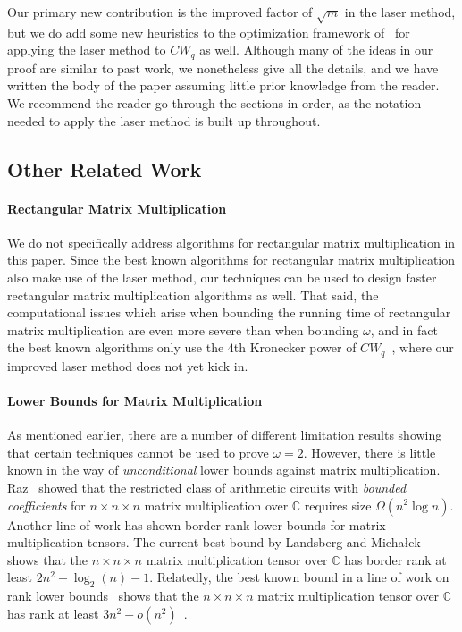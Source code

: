 \PassOptionsToPackage{shortlabels}{enumitem}\documentclass[10pt,a4paper]{article}
\begin{document}
Our primary new contribution is the improved factor of $\sqrt{m}$ in the laser method, but we do add some new heuristics to the optimization framework of~\cite{v12,legall} for applying the laser method to $CW_q$ as well. Although many of the ideas in our proof are similar to past work, we nonetheless give all the details, and we have written the body of the paper assuming little prior knowledge from the reader. We recommend the reader go through the sections in order, as the notation needed to apply the laser method is built up throughout.


\subsection{Other Related Work}

\paragraph*{Rectangular Matrix Multiplication}

We do not specifically address algorithms for rectangular matrix multiplication in this paper. Since the best known algorithms for rectangular matrix multiplication also make use of the laser method, our techniques can be used to design faster rectangular matrix multiplication algorithms as well. That said, the computational issues which arise when bounding the running time of rectangular matrix multiplication are even more severe than when bounding $\omega$, and in fact the best known algorithms only use the $4$th Kronecker power of $CW_q$~\cite{legallrect2}, where our improved laser method does not yet kick in. 

\paragraph*{Lower Bounds for Matrix Multiplication}

As mentioned earlier, there are a number of different limitation results showing that certain techniques cannot be used to prove $\omega=2$. However, there is little known in the way of \emph{unconditional} lower bounds against matrix multiplication. Raz~\cite{raz2002complexity} showed that the restricted class of arithmetic circuits with \emph{bounded coefficients} for $n \times n \times n$ matrix multiplication over $\mathbb{C}$ requires size $\Omega(n^2 \log n)$. Another line of work \cite{strassen1983rank,lickteig1984note,burgisser2011geometric,landsberg2015new,landsberg20172} has shown border rank lower bounds for matrix multiplication tensors. The current best bound by Landsberg and Micha{\l}ek~\cite{landsberg20172} shows that the $n \times n \times n$ matrix multiplication tensor over $\mathbb{C}$ has border rank at least $2n^2 - \log_2(n) - 1$. Relatedly, the best known bound in a line of work on rank lower bounds~\cite{blaser19995,shpilka2003lower,landsberg2014new} shows that the $n \times n \times n$ matrix multiplication tensor over $\mathbb{C}$ has rank at least $3n^2 - o(n^2)$~\cite{landsberg2014new}.
\end{document}
